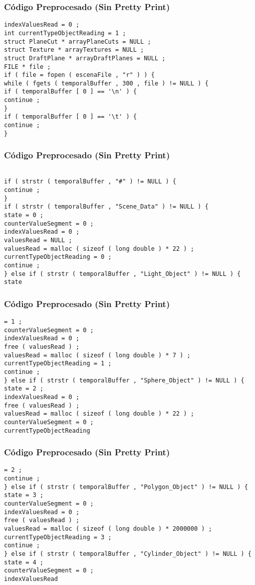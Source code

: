 \documentclass{beamer}
\begin{document}
\begin{frame}[fragile]
\frametitle{C\'odigo Preprocesado (Sin Pretty Print)}
\begin{lstlisting}[style=CStyle]
indexValuesRead = 0 ; 
int currentTypeObjectReading = 1 ; 
struct PlaneCut * arrayPlaneCuts = NULL ; 
struct Texture * arrayTextures = NULL ; 
struct DraftPlane * arrayDraftPlanes = NULL ; 
FILE * file ; 
if ( file = fopen ( escenaFile , "r" ) ) { 
while ( fgets ( temporalBuffer , 300 , file ) != NULL ) { 
if ( temporalBuffer [ 0 ] == '\n' ) { 
continue ; 
} 
if ( temporalBuffer [ 0 ] == '\t' ) { 
continue ; 
} \end{lstlisting}
\end{frame}
\begin{frame}[fragile]
\frametitle{C\'odigo Preprocesado (Sin Pretty Print)}
\begin{lstlisting}[style=CStyle]

if ( strstr ( temporalBuffer , "#" ) != NULL ) { 
continue ; 
} 
if ( strstr ( temporalBuffer , "Scene_Data" ) != NULL ) { 
state = 0 ; 
counterValueSegment = 0 ; 
indexValuesRead = 0 ; 
valuesRead = NULL ; 
valuesRead = malloc ( sizeof ( long double ) * 22 ) ; 
currentTypeObjectReading = 0 ; 
continue ; 
} else if ( strstr ( temporalBuffer , "Light_Object" ) != NULL ) { 
state \end{lstlisting}
\end{frame}
\begin{frame}[fragile]
\frametitle{C\'odigo Preprocesado (Sin Pretty Print)}
\begin{lstlisting}[style=CStyle]
= 1 ; 
counterValueSegment = 0 ; 
indexValuesRead = 0 ; 
free ( valuesRead ) ; 
valuesRead = malloc ( sizeof ( long double ) * 7 ) ; 
currentTypeObjectReading = 1 ; 
continue ; 
} else if ( strstr ( temporalBuffer , "Sphere_Object" ) != NULL ) { 
state = 2 ; 
indexValuesRead = 0 ; 
free ( valuesRead ) ; 
valuesRead = malloc ( sizeof ( long double ) * 22 ) ; 
counterValueSegment = 0 ; 
currentTypeObjectReading \end{lstlisting}
\end{frame}
\begin{frame}[fragile]
\frametitle{C\'odigo Preprocesado (Sin Pretty Print)}
\begin{lstlisting}[style=CStyle]
= 2 ; 
continue ; 
} else if ( strstr ( temporalBuffer , "Polygon_Object" ) != NULL ) { 
state = 3 ; 
counterValueSegment = 0 ; 
indexValuesRead = 0 ; 
free ( valuesRead ) ; 
valuesRead = malloc ( sizeof ( long double ) * 2000000 ) ; 
currentTypeObjectReading = 3 ; 
continue ; 
} else if ( strstr ( temporalBuffer , "Cylinder_Object" ) != NULL ) { 
state = 4 ; 
counterValueSegment = 0 ; 
indexValuesRead \end{lstlisting}
\end{frame}
\end{document}

